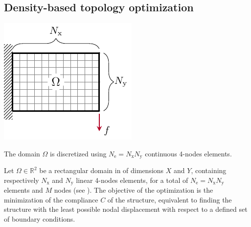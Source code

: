 \subsection{Density-based topology optimization}

\begin{marginfigure}
    \centering
    \includegraphics{figures/02_literature/01_contin_mesh/c_mesh.pdf}
    \caption{The domain $\Omega$ is discretized using $N_\text{e}=N_\text{x} N_\text{y}$ continuous 4-nodes elements.}
    \label{fig:02_mesh_c}
\end{marginfigure}
Let $\Omega \in \mathbb{R}^2$ be a rectangular domain in of dimensions $X$ and $Y$, containing respectively $N_\text{x}$ and $N_\text{y}$ linear 4-nodes elements, for a total of $N_\text{e}=N_\text{x} N_\text{y}$ elements and $M$ nodes (see ). The objective of the optimization is the minimization of the compliance $C$ of the structure, equivalent to finding the structure with the least possible nodal displacement with respect to a defined set of boundary conditions. 

